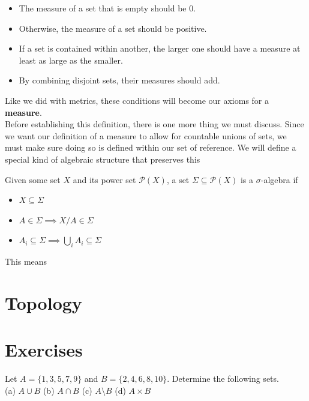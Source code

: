 \begin{itemize}
    \item The measure of a set that is empty should be $0$.
    \item Otherwise, the measure of a set should be positive.
    \item If a set is contained within another, the larger one should have a measure at least as large as the smaller.
    \item By combining disjoint sets, their measures should add.
\end{itemize}

Like we did with metrics, these conditions will become our axioms for a \textbf{measure}. \\

Before establishing this definition, there is one more thing we must discuss. Since we want our definition of a measure to allow for countable unions of sets, we must make sure doing so is defined within our set of reference. We will define a special kind of algebraic structure that preserves this

\begin{definition}
    Given some set $X$ and its power set $\mathcal{P}(X)$, a set $\Sigma\subseteq \mathcal{P}(X)$ is a $\sigma$-algebra if
        \begin{itemize}
            \item $X \subseteq \Sigma$
            \item $A\in\Sigma \implies X / A\in\Sigma$
            \item $A_i\subseteq\Sigma \implies \bigcup_i A_i\subseteq \Sigma$
        \end{itemize}
\end{definition} 

This means 
\\

\section{Topology}


\section*{Exercises}
\setcounter{section}{5}

\begin{exercise}
  Let $A = \{1, 3, 5, 7, 9\}$ and $B = \{2, 4, 6, 8, 10\}$.
  Determine the following sets. \\
  (a) $A \cup B$ \quad
  (b) $A \cap B$ \quad
  (c) $A \setminus B$ \quad
  (d) $A \times B$
\end{exercise}

